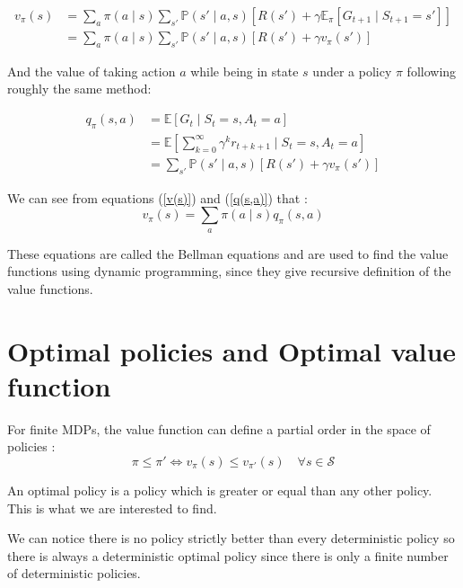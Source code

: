 \documentclass[14pt,a4paper]{article}
\def\iff{\Leftrightarrow}
\theoremstyle{definition}
\begin{document}
\begin{equation}
\begin{split}
v_{\pi}(s)&= \sum_{a}\pi(a \mid s)\sum_{s'}\mathbb{P}(s'\mid a,s)\left[R(s') +\gamma \mathbb{E}_{\pi}\left[  G_{t+1} \mid S_{t+1}=s'  \right]\right]
\\&=\sum_{a}\pi(a \mid s)\sum_{s'}\mathbb{P}(s'\mid a,s)\left[R(s') + \gamma v_{\pi}(s')\right]
\end{split}
\label{v(s)}
\end{equation}



And the value of taking action $a$ while being in state $s$ under a policy $\pi$ following roughly the same method:

\begin{equation}
\begin{split}
q_{\pi}(s,a)&= \mathbb{E}\left[G_t\mid S_t=s, A_t=a\right]
\\&=\mathbb{E}\left[\sum_{k=0}^{\infty}\gamma^{k}r_{t+k+1}\mid S_t=s,A_t=a\right]
\\&= \sum_{s'}\mathbb{P}(s'\mid a,s)\left[R(s')+\gamma v_{\pi}(s')\right]
\end{split}
\label{q(s,a)}
\end{equation}



We can see from equations (\ref{v(s)}) and (\ref{q(s,a)})  that : 
\begin{equation}
v_{\pi}(s)=\sum_{a}\pi(a\mid s)q_{\pi}(s,a)
\end{equation}

These equations are called the Bellman equations and are used to find the value functions using dynamic programming, since they give recursive definition of the value functions.




\section{Optimal policies and Optimal value function}

For finite MDPs, the value function can define a partial order in the space of policies : 
$$ 
\pi\leq \pi' \iff v_{\pi} (s)\leq v_{\pi'} (s) \quad \forall s \in \mathcal{S}
$$

An optimal policy is a policy which is greater or equal than any other policy. This is what we are interested to find.

We can notice there is no policy strictly better than every deterministic policy \citep{Puterman} so there is always a deterministic optimal policy since there is only a finite number of deterministic policies.
\end{document}
